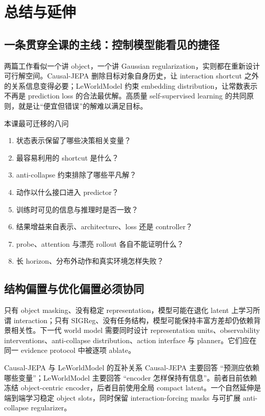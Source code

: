 \section{总结与延伸}

\subsection{一条贯穿全课的主线：控制模型能看见的捷径}

两篇工作看似一个讲 object，一个讲 Gaussian regularization，实则都在重新设计可行解空间。Causal-JEPA 删除目标对象自身历史，让 interaction shortcut 之外的关系信息变得必要；LeWorldModel 约束 embedding distribution，让常数表示不再是 prediction loss 的合法最优解。高质量 self-supervised learning 的共同原则，就是让``便宜但错误''的解难以满足目标。

\begin{importantbox}{本课最可迁移的八问}
\begin{enumerate}
  \item 状态表示保留了哪些决策相关变量？
  \item 最容易利用的 shortcut 是什么？
  \item anti-collapse 约束排除了哪些平凡解？
  \item 动作以什么接口进入 predictor？
  \item 训练时可见的信息与推理时是否一致？
  \item 结果增益来自表示、architecture、loss 还是 controller？
  \item probe、attention 与漂亮 rollout 各自不能证明什么？
  \item 长 horizon、分布外动作和真实环境怎样失败？
\end{enumerate}
\end{importantbox}

\subsection{结构偏置与优化偏置必须协同}

只有 object masking、没有稳定 representation，模型可能在退化 latent 上学习所谓 interaction；只有 SIGReg、没有任务结构，模型可能保持丰富方差却仍依赖背景相关性。下一代 world model 需要同时设计 representation units、observability interventions、anti-collapse distribution、action interface 与 planner。它们应在同一 evidence protocol 中被逐项 ablate。

\begin{knowledgebox}{Causal-JEPA 与 LeWorldModel 的互补关系}
Causal-JEPA 主要回答 ``预测应依赖哪些变量''；LeWorldModel 主要回答 ``encoder 怎样保持有信息''。前者目前依赖冻结 object-centric encoder，后者目前使用全局 compact latent。一个自然延伸是端到端学习稳定 object slots，同时保留 interaction-forcing masks 与可扩展 anti-collapse regularizer。
\end{knowledgebox}

